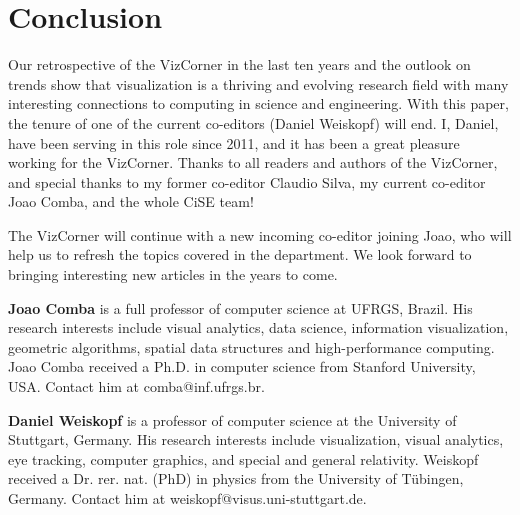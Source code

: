 \documentclass[10pt,journal,compsoc]{IEEEtran}
\begin{document}
\section{Conclusion}

Our retrospective of the VizCorner in the last ten years and the outlook on trends show that visualization is a thriving and evolving research field with many interesting connections to computing in science and engineering. With this paper, the tenure of one of the current co-editors (Daniel Weiskopf) will end. 
I, Daniel, have been serving in this role since 2011, and it has been a great pleasure working for the VizCorner. Thanks to all readers and authors of the VizCorner, and special thanks to my former co-editor Claudio Silva, my current co-editor Joao Comba, and the whole CiSE team!

The VizCorner will continue with a new incoming co-editor joining Joao, who will help us to refresh the topics covered in the department. We look forward to bringing interesting new articles in the years to come.





\bigskip

\textbf{Joao Comba} is a full professor of computer science at UFRGS, Brazil. His research interests include visual analytics, data science, information visualization, geometric algorithms, spatial data structures and high-performance computing. Joao Comba received a Ph.D. in computer science from Stanford University, USA. Contact him at comba@inf.ufrgs.br.


\textbf{Daniel Weiskopf} is a professor of computer science at the University of Stuttgart, Germany. His research interests include visualization, visual analytics, eye tracking, computer graphics, and special and general relativity. Weiskopf received a Dr. rer. nat. (PhD) in physics from the University of T\"ubingen, Germany. Contact him at weiskopf@visus.uni-stuttgart.de.
\end{document}
